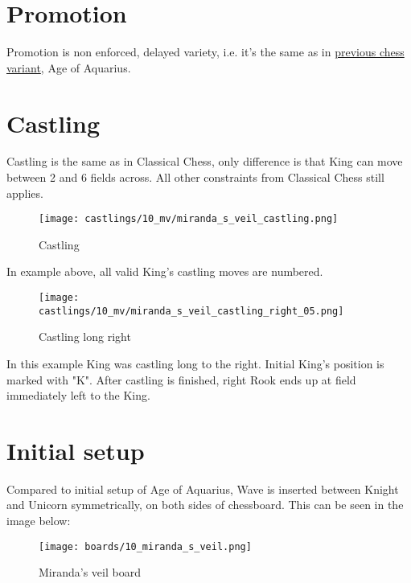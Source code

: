 
\vspace*{9.0\baselineskip}
\section*{Promotion}

Promotion is non enforced, delayed variety, i.e. it's the same as in
\hyperref[sec:Age of Aquarius/Promotion]{previous chess variant}, Age of Aquarius.

\clearpage %

\section*{Castling}

Castling is the same as in Classical Chess, only difference is that King can move between 2 and 6 fields across.
All other constraints from Classical Chess still applies.

\noindent
\begin{figure}[!h]
\texttt{[image: castlings/10\_mv/miranda\_s\_veil\_castling.png]}
\caption{Castling}
\label{fig:miranda_s_veil_castling}
\end{figure}

In example above, all valid King's castling moves are numbered.

\noindent
\begin{figure}[!h]
\texttt{[image: castlings/10\_mv/miranda\_s\_veil\_castling\_right\_05.png]}
\caption{Castling long right}
\label{fig:miranda_s_veil_castling_right_05}
\end{figure}

In this example King was castling long to the right. Initial King's position is marked with "K".
After castling is finished, right Rook ends up at field immediately left to the King.

\clearpage %

\section*{Initial setup}

Compared to initial setup of Age of Aquarius, Wave is inserted between Knight and Unicorn
symmetrically, on both sides of chessboard. This can be seen in the image below:

\noindent
\begin{figure}[h]
\texttt{[image: boards/10\_miranda\_s\_veil.png]}
\caption{Miranda's veil board}
\label{fig:10_miranda_s_veil}
\end{figure}

\clearpage %
